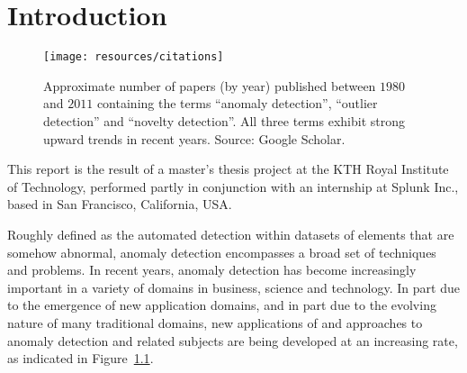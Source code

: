\chapter{Introduction}

\begin{figure}[htb]
    \vspace{-10pt}
    \begin{center}
        \texttt{[image: resources/citations]}
    \end{center}
    \vspace{-20pt}
    \caption{\small Approximate number of papers (by year) published between $1980$ and $2011$ containing the terms ``anomaly detection'', ``outlier detection'' and ``novelty detection''. All three terms exhibit strong upward trends in recent years. Source: Google Scholar.}
    \vspace{-0pt}
\label{fig:citations}
\end{figure}

This report is the result of a master's thesis project at the KTH Royal Institute of Technology, performed partly in conjunction with an internship at Splunk Inc.\@, based in San Francisco, California, USA\@. %


Roughly defined as the automated detection within datasets of elements that are somehow abnormal, anomaly detection encompasses a broad set of techniques and problems. In recent years, anomaly detection has become increasingly important in a variety of domains in business, science and technology. In part due to the emergence of new application domains, and in part due to the evolving nature of many traditional domains, new applications of and approaches to anomaly detection and related subjects are being developed at an increasing rate, as indicated in Figure~\ref{fig:citations}.

